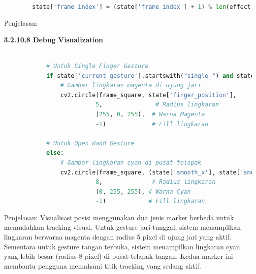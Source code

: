 \documentclass[11pt,a4paper]{article}
\begin{document}
    \begin{lstlisting}[language=Python, caption=Update Animasi]
    
        state['frame_index'] = (state['frame_index'] + 1) % len(effect_frames)
    \end{lstlisting}
    Penjelasan:

    \noindent\textbf{3.2.10.8 Debug Visualization}
    \begin{lstlisting}[language=Python, caption=Visualisasi Posisi]
    
            # Untuk Single Finger Gesture
            if state['current_gesture'].startswith("single_") and state['finger_position']:
                # Gambar lingkaran magenta di ujung jari
                cv2.circle(frame_square, state['finger_position'], 
                          5,               # Radius lingkaran
                          (255, 0, 255),  # Warna Magenta
                          -1)             # Fill lingkaran
            
            # Untuk Open Hand Gesture
            else:
                # Gambar lingkaran cyan di pusat telapak
                cv2.circle(frame_square, (state['smooth_x'], state['smooth_y']), 
                          8,              # Radius lingkaran
                          (0, 255, 255), # Warna Cyan
                          -1)            # Fill lingkaran
    \end{lstlisting}
    Penjelasan: Visualisasi posisi menggunakan dua jenis marker berbeda untuk memudahkan tracking visual. Untuk gesture jari tunggal, sistem menampilkan lingkaran berwarna magenta dengan radius 5 pixel di ujung jari yang aktif. Sementara untuk gesture tangan terbuka, sistem menampilkan lingkaran cyan yang lebih besar (radius 8 pixel) di pusat telapak tangan. Kedua marker ini membantu pengguna memahami titik tracking yang sedang aktif.
\end{document}
